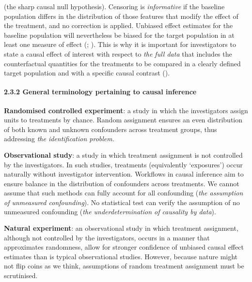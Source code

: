 \documentclass[
  singlecolumn]{article}
\let\oldparagraph\paragraph
\renewcommand{\paragraph}[1]{\oldparagraph{#1}\mbox{}}
\begin{document}
\begin{itemize}
  (the sharp causal null hypothesis). Censoring is \emph{informative} if
  the baseline population differs in the distribution of those features
  that modify the effect of the treatment, and no correction is applied.
  Unbiased effect estimates for the baseline population will
  nevertheless be biased for the target population in at least one
  measure of effect (; ). This is why
  it is important for investigators to state a causal effect of interest
  with respect to \emph{the full data} that includes the counterfactual
  quantities for the treatments to be compared in a clearly defined
  target population and with a specific causal contrast
  ().
\end{itemize}

\paragraph{2.3.2 General terminology pertaining to causal
inference}\label{general-terminology-pertaining-to-causal-inference}

\textbf{Randomised controlled experiment}: a study in which the
investigators assign units to treatments by chance. Random assignment
ensures an even distribution of both known and unknown confounders
across treatment groups, thus addressing \emph{the identification
problem.}

\textbf{Observational study}: a study in which treatment assignment is
not controlled by the investigators. In such studies, treatments
(equivalently `exposures') occur naturally without investigator
intervention. Workflows in causal inference aim to ensure balance in the
distribution of confounders across treatments. We cannot assume that
such methods can fully account for all confounding (\emph{the assumption
of unmeasured confounding}). No statistical test can verify the
assumption of no unmeasured confounding (\emph{the underdetermination of
causality by data}).

\textbf{Natural experiment}: an observational study in which treatment
assignment, although not controlled by the investigators, occurs in a
manner that approximates randomness, allow for stronger confidence of
unbiased causal effect estimates than is typical observational studies.
However, because nature might not flip coins as we think, assumptions of
random treatment assignment must be scrutinised.
\end{document}
